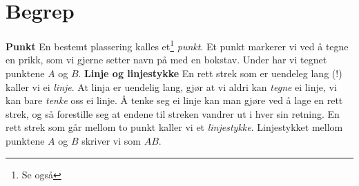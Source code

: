 




\newpage
\section{Begrep}
\textbf{Punkt}\os
En bestemt plassering kalles et\footnote{Se også } \textit{punkt}. Et punkt markerer vi ved å tegne en prikk, som vi gjerne setter navn på med en bokstav. Under har vi tegnet punktene $ A $ og $ B $.
\textbf{Linje og linjestykke}\os
En rett strek som er uendeleg lang (!) kaller vi ei \textit{linje}. At linja er uendelig lang, gjør at vi aldri kan \textsl{tegne} ei linje, vi kan bare \textsl{tenke} oss ei linje. Å tenke seg ei linje kan man gjøre ved å lage en rett strek, og så forestille seg at endene til streken vandrer ut i hver sin retning.
En rett strek som går mellom to punkt kaller vi et \textit{linjestykke}.
Linjestykket mellom punktene $ A $ og $ B $ skriver vi som $ AB $. 


